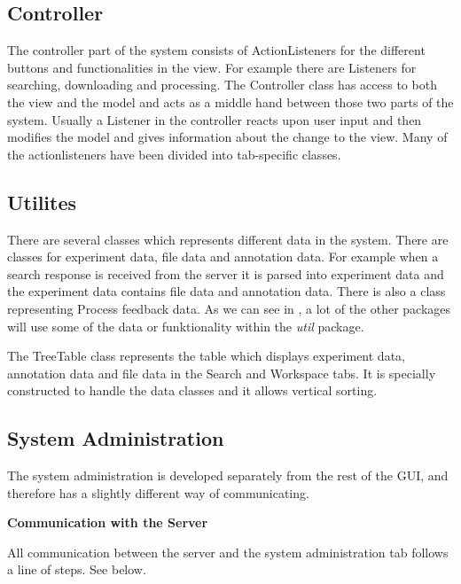 \subsection{Controller}
The controller part of the system consists of ActionListeners for the different buttons and functionalities in the view. For example there are Listeners for searching, downloading and processing. The Controller class has access to both the view and the model and acts as a middle hand between those two parts of the system. Usually a Listener in the controller reacts upon user input and then modifies the model and gives information about the change to the view. Many of the actionlisteners have been divided into tab-specific classes.


\subsection{Utilites}

There are several classes which represents different data in the system. There are classes for experiment data, file data and annotation data. For example when a search response is received from the server it is parsed into experiment data and the experiment data contains file data and annotation data. There is also a class representing Process feedback data. As we can see in ,  a lot of the other packages will use some of the data or funktionality within the \textit{util} package.

The TreeTable class represents the table which displays experiment data, annotation data and file data in the Search and Workspace tabs. It is specially constructed to handle the data classes and it allows vertical sorting.

\subsection{System Administration}
The system administration is developed separately from the rest of the GUI, and therefore has a slightly different way of communicating.

\textbf{Communication with the Server}


All communication between the server and the system administration tab follows a line of steps. See  below.

